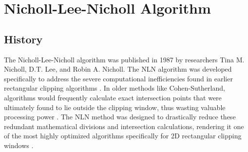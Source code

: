 
\section{Nicholl-Lee-Nicholl Algorithm}

\subsection{History}
The Nicholl-Lee-Nicholl algorithm was published in 1987 by researchers Tina M. Nicholl, D.T. Lee, and Robin A. Nicholl. The NLN algorithm was developed specifically to address the severe computational inefficiencies found in earlier rectangular clipping algorithms \cite{MatthesDrakopoulos2022}.
In older methods like Cohen-Sutherland, algorithms would frequently calculate exact intersection points that were ultimately found to lie outside the clipping window, thus wasting valuable processing power \cite{NichollLeeNicholl1987}. The NLN method was designed to drastically reduce these redundant mathematical divisions and intersection calculations, rendering it one of the most highly optimized algorithms specifically for 2D rectangular clipping windows \cite{MatthesDrakopoulos2022}.

